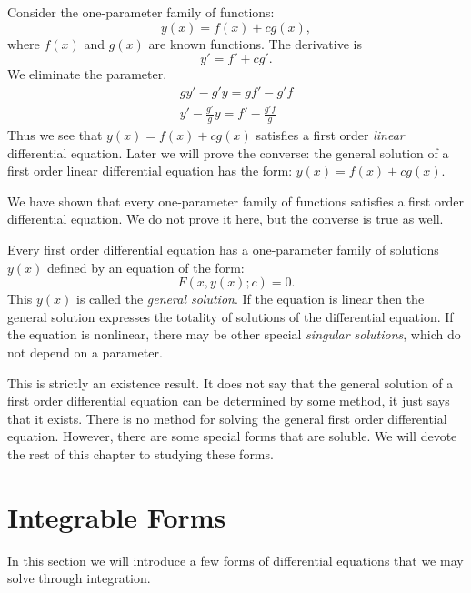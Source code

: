 \begin{Example}
  Consider the one-parameter family of functions:
  \[
  y(x) = f(x) + c g(x),
  \]
  where $f(x)$ and $g(x)$ are known functions.  The derivative is
  \[
  y' = f' + c g'.
  \]
  We eliminate the parameter.
  \begin{gather*}
    g y' - g' y = g f' - g' f \\
    y' - \frac{g'}{g} y = f' - \frac{g' f}{g}
  \end{gather*}
  Thus we see that $y(x) = f(x) + c g(x)$ satisfies a first order 
  \textit{linear} differential equation.  Later we will prove the 
  converse: the general solution of a first order linear differential
  equation has the form: $y(x) = f(x) + c g(x)$.
\end{Example}



We have shown that every one-parameter family of functions satisfies a first 
order differential equation.  We do not prove it here, but the converse 
is true as well.


\begin{Result}
  Every first order differential equation has a one-parameter family of 
  solutions $y(x)$ defined by an equation of the form:
  \[
  F(x, y(x); c) = 0.
  \]
  This $y(x)$ is called the \textit{general solution}.  If the
  equation is linear then the general solution expresses the
  totality of solutions of the differential equation.  If the
  equation is nonlinear, there may be other special \textit{singular
    solutions}, which do not depend on a parameter.
\end{Result}



This is strictly an existence result.  It does not say that the general 
solution of a first order differential equation can be determined by some
method, it just says that it exists.  There is no method for solving 
the general first order differential equation.  However, there are some
special forms that are soluble.  We will devote the rest of this chapter 
to studying these forms.





\section{Integrable Forms}


In this section we will introduce a few forms of differential equations
that we may solve through integration.


